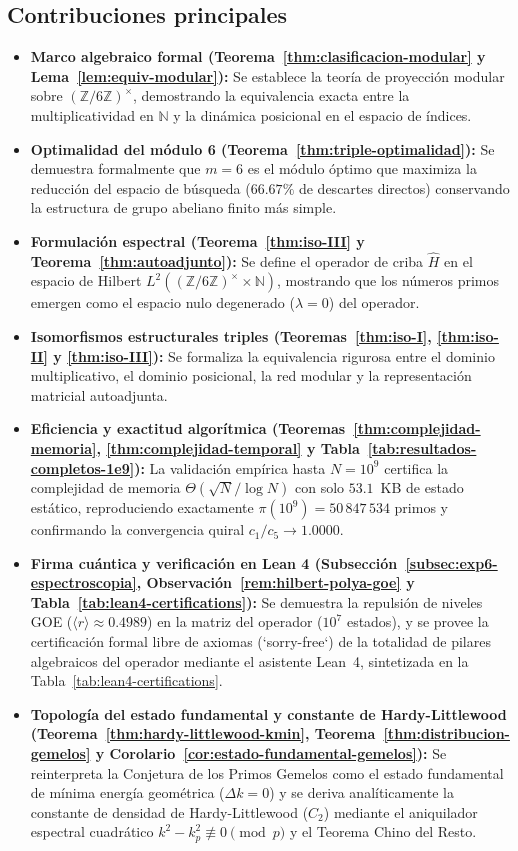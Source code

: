 \documentclass{article}
\numberwithin{equation}{section}
\theoremstyle{plain}
\theoremstyle{definition}
\begin{document}
\subsection*{Contribuciones principales}

\begin{itemize}
    \item \textbf{Marco algebraico formal (Teorema~\ref{thm:clasificacion-modular} y Lema~\ref{lem:equiv-modular}):} Se establece la teoría de proyección modular sobre $(\mathbb{Z}/6\mathbb{Z})^\times$, demostrando la equivalencia exacta entre la multiplicatividad en $\mathbb{N}$ y la dinámica posicional en el espacio de índices.
    \item \textbf{Optimalidad del módulo 6 (Teorema~\ref{thm:triple-optimalidad}):} Se demuestra formalmente que $m=6$ es el módulo óptimo que maximiza la reducción del espacio de búsqueda ($66.67\%$ de descartes directos) conservando la estructura de grupo abeliano finito más simple.
    \item \textbf{Formulación espectral (Teorema~\ref{thm:iso-III} y Teorema~\ref{thm:autoadjunto}):} Se define el operador de criba $\hat{H}$ en el espacio de Hilbert $L^2((\mathbb{Z}/6\mathbb{Z})^\times \times \mathbb{N})$, mostrando que los números primos emergen como el espacio nulo degenerado ($\lambda = 0$) del operador.
    \item \textbf{Isomorfismos estructurales triples (Teoremas~\ref{thm:iso-I}, \ref{thm:iso-II} y \ref{thm:iso-III}):} Se formaliza la equivalencia rigurosa entre el dominio multiplicativo, el dominio posicional, la red modular y la representación matricial autoadjunta.
    \item \textbf{Eficiencia y exactitud algorítmica (Teoremas~\ref{thm:complejidad-memoria}, \ref{thm:complejidad-temporal} y Tabla~\ref{tab:resultados-completos-1e9}):} La validación empírica hasta $N=10^9$ certifica la complejidad de memoria $\Theta(\sqrt{N}/\log N)$ con solo $53.1$~KB de estado estático, reproduciendo exactamente $\pi(10^9)=50\,847\,534$ primos y confirmando la convergencia quiral $c_1/c_5 \to 1.0000$.
    \item \textbf{Firma cuántica y verificación en Lean 4 (Subsección~\ref{subsec:exp6-espectroscopia}, Observación~\ref{rem:hilbert-polya-goe} y Tabla~\ref{tab:lean4-certifications}):} Se demuestra la repulsión de niveles GOE ($\langle r \rangle \approx 0.4989$) en la matriz del operador ($10^7$ estados), y se provee la certificación formal libre de axiomas (`sorry-free`) de la totalidad de pilares algebraicos del operador mediante el asistente Lean~4\cite{Lean4}, sintetizada en la Tabla~\ref{tab:lean4-certifications}.
    \item \textbf{Topología del estado fundamental y constante de Hardy-Littlewood (Teorema~\ref{thm:hardy-littlewood-kmin}, Teorema~\ref{thm:distribucion-gemelos} y Corolario~\ref{cor:estado-fundamental-gemelos}):} Se reinterpreta la Conjetura de los Primos Gemelos como el estado fundamental de mínima energía geométrica ($\Delta k = 0$) y se deriva analíticamente la constante de densidad de Hardy-Littlewood ($C_2$) mediante el aniquilador espectral cuadrático $k^2 - k_p^2 \not\equiv 0 \pmod p$ y el Teorema Chino del Resto.
\end{itemize}
\end{document}
